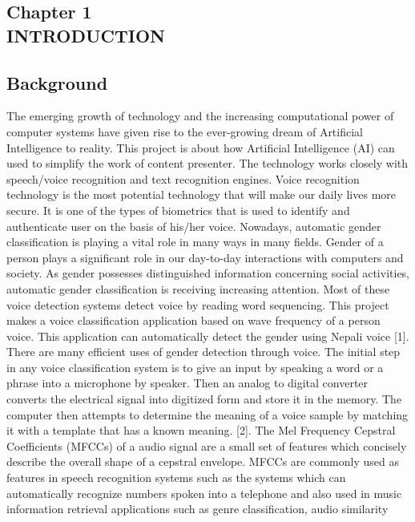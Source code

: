 \documentclass[a4paper,12pt]{article}
\begin{document}
\tableofcontents
\pagebreak
{}
\begin{center}
    \section*{Chapter 1 \\ INTRODUCTION}
\end{center}
\addtocounter{section}{1}
\subsection{Background}
{The emerging growth of technology and the increasing computational power of computer
systems have given rise to the ever-growing dream of Artificial Intelligence to reality. This
project is about how Artificial Intelligence (AI) can used to simplify the work of content
presenter. The technology works closely with speech/voice recognition and text recognition
engines. Voice recognition technology is the most potential technology that will make our daily
lives more secure. It is one of the types of biometrics that is used to identify and authenticate
user on the basis of his/her voice. Nowadays, automatic gender classification is playing a vital
role in many ways in many fields. Gender of a person plays a significant role in our day-to-day
interactions with computers and society. As gender possesses distinguished information
concerning social activities, automatic gender classification is receiving increasing attention.
Most of these voice detection systems detect voice by reading word sequencing. This project
makes a voice classification application based on wave frequency of a person voice. This
application can automatically detect the gender using Nepali voice [1]. There are many efficient
uses of gender detection through voice. The initial step in any voice classification system is to
give an input by speaking a word or a phrase into a microphone by speaker. Then an analog to
digital converter converts the electrical signal into digitized form and store it in the memory.
The computer then attempts to determine the meaning of a voice sample by matching it with a
template that has a known meaning. [2]. The Mel Frequency Cepstral Coefficients (MFCCs)
of a audio signal are a small set of features which concisely describe the overall shape of a
cepstral envelope. MFCCs are commonly used as features in speech recognition systems such
as the systems which can automatically recognize numbers spoken into a telephone and also
used in music information retrieval applications such as genre classification, audio similarity
}
\end{document}
